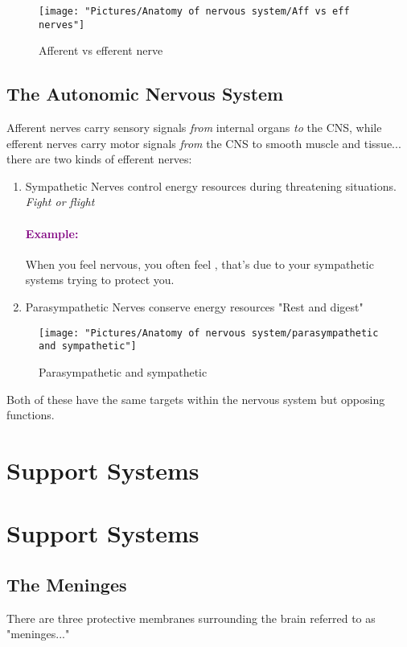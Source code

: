 \documentclass[12pt,a4paper]{article}
\newcommand{\example}[1]{\paragraph{\textcolor{purple}{Example:}} #1}
\begin{document}
	
\begin{figure}
	\centering
	\texttt{[image: "Pictures/Anatomy of nervous system/Aff vs eff nerves"]}
	\caption{Afferent vs efferent nerve}
	\label{fig:aff-vs-eff-nerves}
\end{figure}

	
	\subsection{The Autonomic Nervous System}
	
	Afferent nerves carry sensory signals \textit{from} internal organs \textit{to} the CNS, while efferent nerves carry motor signals \textit{from} the CNS to smooth muscle and tissue... there are two kinds of efferent nerves: 
	\begin{enumerate}
		\item Sympathetic
		\subitem Nerves control energy resources during threatening situations. 
		\subsubitem \textit{Fight or flight} 
		\example{When you feel nervous, you often feel , that's due to your sympathetic systems trying to protect you.}
		\item Parasympathetic 
		\subitem Nerves conserve energy resources 
		\subsubitem "Rest and digest"
	\end{enumerate}
	
\begin{figure}
	\centering
	\texttt{[image: "Pictures/Anatomy of nervous system/parasympathetic and sympathetic"]}
	\caption{Parasympathetic and sympathetic}
	\label{fig:parasympathetic-and-sympathetic}
\end{figure}

	Both of these have the same targets within the nervous system but opposing functions. 
	
	\section*{Support Systems}
	
	\section{Support Systems}
	
	\subsection{The Meninges}
	
	There are three protective membranes surrounding the brain referred to as "meninges..."
	
\end{document}
